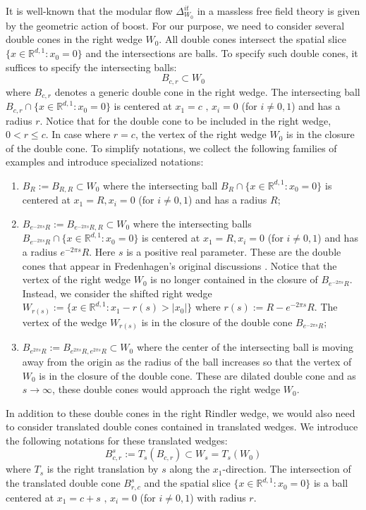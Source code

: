 \documentclass[a4paper,11pt]{article}
\theoremstyle{definition}
\begin{document}
It is well-known \cite{bisognanowichmann}that the modular flow $\Delta_{W_0}^{it}$ in a massless free field theory is given by the geometric action of boost. For our purpose, we need to consider several double cones in the right wedge $W_0$. All double cones intersect the spatial slice $\{x\in\mathbb{R}^{d,1}: x_0 = 0\}$ and the intersections are balls. To specify such double cones, it suffices to specify the intersecting balls: 
\begin{equation}
    B_{c,r}\subset W_0
\end{equation}
where $B_{c,r}$ denotes a generic double cone in the right wedge. The intersecting ball $B_{c,r}\cap\{x\in\mathbb{R}^{d,1}:x_0 = 0\}$ is centered at $x_1 = c\text{ , }x_i = 0$ (for $i\neq 0,1$) and has a radius $r$. Notice that for the double cone to be included in the right wedge, $0 < r \leq c$. In case where $r = c$, the vertex of the right wedge $W_0$ is in the closure of the double cone. To simplify notations, we collect the following families of examples and introduce specialized notations:
\begin{enumerate}
    \item $B_R:=B_{R, R}\subset W_0$ where the intersecting ball $B_R\cap \{x\in\mathbb{R}^{d,1}: x_0 = 0\}$ is centered at $x_1 = R, x_i = 0$ (for $i\neq 0, 1$) and has a radius $R$;
    \item $B_{e^{-2\pi s}R} := B_{e^{-2\pi s}R, R}\subset W_0$ where the intersecting balls $B_{e^{-2\pi s}R}\cap\{x\in\mathbb{R}^{d,1}:x_0 =0\}$ is centered at $x_1 = R, x_i = 0$ (for $i\neq 0, 1$) and has a radius $e^{-2\pi s}R$. Here $s$ is a positive real parameter. These are the double cones that appear in Fredenhagen's original discussions \cite{fredenhagen}. Notice that the vertex of the right wedge $W_0$ is no longer contained in the closure of $B_{e^{-2\pi s}R}$. Instead, we consider the shifted right wedge $W_{r(s)}:= \{x\in\mathbb{R}^{d,1}: x_1 - r(s) > |x_0|\}$ where $r(s) := R - e^{-2\pi s}R$. The vertex of the wedge $W_{r(s)}$ is in the closure of the double cone $B_{e^{-2\pi s}R}$;
    \item $B_{e^{2\pi s}R}:= B_{e^{2\pi s}R, e^{2\pi s}R}\subset W_0$ where the center of the intersecting ball is moving away from the origin as the radius of the ball increases so that the vertex of $W_0$ is in the closure of the double cone. These are dilated double cone and as $s\rightarrow \infty$, these double cones would approach the right wedge $W_0$.
\end{enumerate}
In addition to these double cones in the right Rindler wedge, we would also need to consider translated double cones contained in translated wedges. We introduce the following notations for these translated wedges:
\begin{equation}
    B^s_{c,r} := T_s(B_{c,r})\subset W_s  = T_s(W_0)
\end{equation}
where $T_s$ is the right translation by $s$ along the $x_1$-direction. The intersection of the translated double cone $B^s_{r,c}$ and the spatial slice $\{x\in\mathbb{R}^{d,1}:x_0 = 0\}$ is a ball centered at $x_1 = c+ s\text{ , }x_i = 0$ (for $i\neq 0, 1$) with radius $r$.
\end{document}
